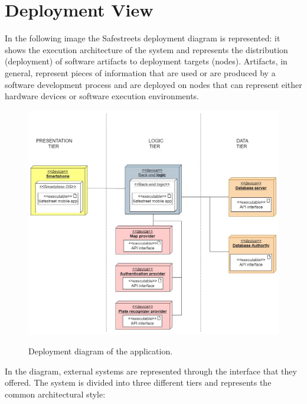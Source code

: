 \documentclass[../RASD.tex]{subfiles}
\begin{document}
    \section{Deployment View}\label{sec:deployment-view}
    In the following image the Safestreets deployment diagram is represented: it shows the execution architecture of the system and represents the distribution (deployment) of software artifacts to deployment targets (nodes). Artifacts, in general, represent pieces of information that are used or are produced by a software development process and are deployed on nodes that can represent either hardware devices or software execution environments.
    \begin{figure}[H]
        \centering
        \includegraphics[scale = 1]{assets/deployment.png}\\[1.6 cm]
        \caption[\textit{Deployment} Diagram]{Deployment diagram of the application.}
    \end{figure}
    In the diagram, external systems are represented through the interface that they offered. The system is divided into three different tiers and represents the common architectural style:
\end{document}
